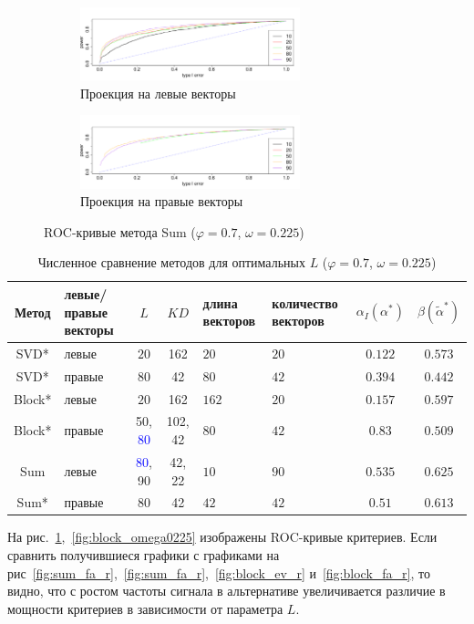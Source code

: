 \documentclass[specialist,
substylefile = spbu_report.rtx,
subf,href,colorlinks=true, 12pt]{disser}
\theoremstyle{definition}
\begin{document}
\begin{figure}[h!]
	\captionsetup[subfigure]{justification=Centering}
	\begin{subfigure}[t]{\textwidth}
		\centering
		\includegraphics[width=0.7\textwidth]{img/roc_sum_ev_omega0225.pdf}
		\caption{Проекция на левые векторы}
	\end{subfigure}
	\begin{subfigure}[t]{\textwidth}
		\centering
		\includegraphics[width=0.7\textwidth]{img/roc_sum_fa_omega0225.pdf}
		\caption{Проекция на правые векторы}
	\end{subfigure}
	\caption{ROC-кривые метода Sum ($\varphi=0.7$, $\omega=0.225$)}
	\label{fig:sum_omega0225}
\end{figure}
\begin{table}[h]
	\caption{Численное сравнение методов для оптимальных $L$ ($\varphi=0.7$, $\omega=0.225$)}
	\label{tab:res_mc-mssa_omega0225}
	\centering
	\begin{tabular}{|c>{\centering\arraybackslash}m{1in}cc>{\centering\arraybackslash}m{1in} >{\centering\arraybackslash}m{1in}cc|}\hline
		Метод & левые/правые векторы & $L$ & $KD$ & длина векторов & количество векторов & $\alpha_I(\alpha^*)$ & $\beta(\widetilde{\alpha}^*)$ \\
		\hline
		SVD* & левые & $20$ & 162 & $20$ & $20$ & $0.122$ & $0.573$ \\
		\hline
		SVD* & правые & $80$ & 42 & $80$ & $42$ & $0.394$ & $0.442$ \\
		\hline
		Block* & левые & $20$ & 162 & $162$ & $20$ & $0.157$ & $\mathbf{0.597}$ \\
		\hline
		Block* & правые & 50, \textcolor{blue}{80} & 102, 42 & $80$ & $42$ & $0.83$ & $0.509$\\
		\hline
		Sum & левые & \textcolor{blue}{80}, 90 & 42, 22 & $10$ & $90$ & $0.535$ & $\mathbf{0.625}$ \\
		\hline
		Sum* & правые & $80$ & 42 & $42$ & $42$ & $0.51$ & $\mathbf{0.613}$ \\
		\hline
	\end{tabular}
\end{table}
На рис.~\ref{fig:sum_omega0225},~\ref{fig:block_omega0225} изображены ROC-кривые критериев. Если сравнить получившиеся графики с графиками на рис~\ref{fig:sum_fa_r},~\ref{fig:sum_fa_r},~\ref{fig:block_ev_r} и~\ref{fig:block_fa_r}, то видно, что с ростом частоты сигнала в альтернативе увеличивается различие в мощности критериев в зависимости от параметра $L$. 
\end{document}

